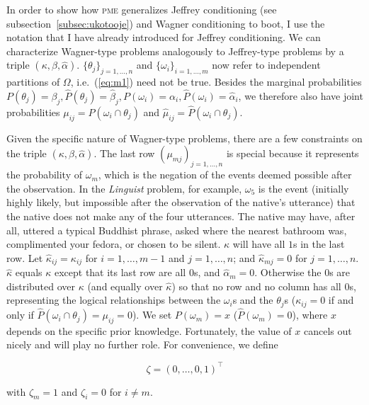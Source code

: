 \documentclass[phd,12pt,oneside]{ubcthesis}
\begin{document}
In order to show how \textsc{pme} generalizes Jeffrey conditioning
(see subsection~\ref{subsec:ukotooje}) and Wagner conditioning to
boot, I use the notation that I have already introduced for Jeffrey
conditioning. We can characterize Wagner-type problems analogously to
Jeffrey-type problems by a triple $(\kappa,\beta,\hat{\alpha})$.
$\{\theta_{j}\}_{j=1,\ldots,n}$ and $\{\omega_{i}\}_{i=1,\ldots,m}$
now refer to independent partitions of $\Omega$, i.e.\ (\ref{eq:m1})
need not be true. Besides the marginal probabilities
$P(\theta_{j})=\beta_{j}, \hat{P}(\theta_{j})=\hat{\beta}_{j},
P(\omega_{i})=\alpha_{i},\hat{P}(\omega_{i})=\hat{\alpha}_{i}$,
we therefore also have joint probabilities
$\mu_{ij}=P(\omega_{i}\cap\theta_{j})$ and
$\hat{\mu}_{ij}=\hat{P}(\omega_{i}\cap\theta_{j})$.

Given the specific nature of Wagner-type problems, there are a few
constraints on the triple $(\kappa,\beta,\hat{\alpha})$. The last row
$(\mu_{mj})_{j=1,\ldots,n}$ is special because it represents the
probability of $\omega_{m}$, which is the negation of the events
deemed possible after the observation. In the \emph{Linguist} problem,
for example, $\omega_{5}$ is the event (initially highly likely, but
impossible after the observation of the native's utterance) that the
native does not make any of the four utterances. The native may have,
after all, uttered a typical Buddhist phrase, asked where the nearest
bathroom was, complimented your fedora, or chosen to be silent.
$\kappa$ will have all $1$s in the last row. Let
$\hat{\kappa}_{ij}=\kappa_{ij}$ for $i=1,\ldots,m-1$ and
$j=1,\ldots,n$; and $\hat{\kappa}_{mj}=0$ for $j=1,\ldots,n$.
$\hat{\kappa}$ equals $\kappa$ except that its last row are all $0$s,
and $\hat{\alpha}_{m}=0$. Otherwise the $0$s are distributed over
$\kappa$ (and equally over $\hat{\kappa}$) so that no row and no
column has all $0$s, representing the logical relationships between
the $\omega_{i}$s and the $\theta_{j}$s ($\kappa_{ij}=0$ if and only
if $\hat{P}(\omega_{i}\cap\theta_{j})=\mu_{ij}=0$). We set
$P(\omega_{m})=x$ ($\hat{P}(\omega_{m})=0$), where $x$ depends on the
specific prior knowledge. Fortunately, the value of $x$ cancels out
nicely and will play no further role. For convenience, we define

\begin{equation}
\label{eq:zeta}
\zeta=(0,\ldots,0,1)^{\top}
\end{equation}

{\noindent}with $\zeta_{m}=1$ and $\zeta_{i}=0$ for $i\neq{}m$.
\end{document}
